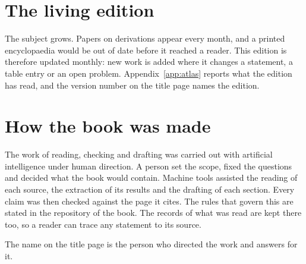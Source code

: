 
\section*{The living edition}

The subject grows.
Papers on derivations appear every month, and a printed encyclopaedia would be out of
date before it reached a reader.
This edition is therefore updated monthly: new work is added where it changes a
statement, a table entry or an open problem.
Appendix~\ref{app:atlas} reports what the edition has read, and the version
number on the title page names the edition.

\section*{How the book was made}

The work of reading, checking and drafting was carried out with artificial
intelligence under human direction.
A person set the scope, fixed the questions and decided what the book would
contain.
Machine tools assisted the reading of each source, the extraction of its results
and the drafting of each section.
Every claim was then checked against the page it cites.
The rules that govern this are stated in the repository of the book.
The records of what was read are kept there too, so a reader can trace any
statement to its source.

The name on the title page is the person who directed the work and answers for
it.
